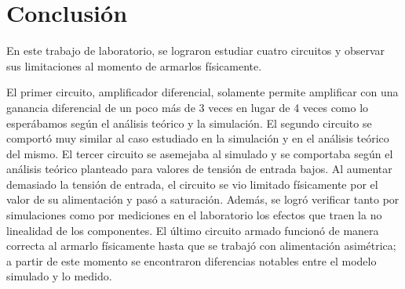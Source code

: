 \section{Conclusión}
En este trabajo de laboratorio, se lograron estudiar cuatro circuitos y observar sus limitaciones al momento de armarlos físicamente.

El primer circuito, amplificador diferencial, solamente permite amplificar con una ganancia diferencial de un poco más de 3 veces en lugar de 4 veces como lo esperábamos según el análisis teórico y la simulación. El segundo circuito se comportó muy similar al caso estudiado en la simulación y en el análisis teórico del mismo. El tercer circuito se asemejaba al simulado y se comportaba según el análisis teórico planteado para valores de tensión de entrada bajos. Al aumentar demasiado la tensión de entrada, el circuito se vio limitado físicamente por el valor de su alimentación y pasó a saturación. Además, se logró verificar tanto por simulaciones como por mediciones en el laboratorio los efectos que traen la no linealidad de los componentes. El último circuito armado funcionó de manera correcta al armarlo físicamente hasta que se trabajó con alimentación asimétrica; a partir de este momento se encontraron diferencias notables entre el modelo simulado y lo medido.

